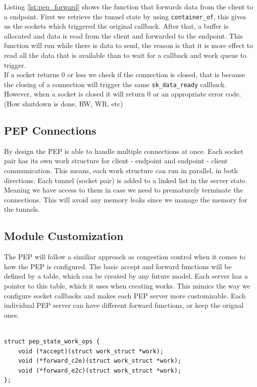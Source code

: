 \documentclass[a4paper,english, 11pt]{report}
\begin{document}
Listing \ref{lst:pep_forward} shows the function that forwards data from the client to a endpoint. First we retrieve the tunnel state by using \verb|container_of|, this gives us the sockets which triggered the original callback. After that, a buffer is allocated and data is read from the client and forwarded to the endpoint. This function will run while there is data to send, the reason is that it is more effect to read all the data that is available than to wait for a callback and work queue to trigger.\\

If a socket returns 0 or less we check if the connection is closed, that is because the closing of a connection will trigger the same \verb|sk_data_ready| callback. However, when a socket is closed it will return 0 or an appropriate error code. (How shutdown is done, RW, WR, etc)

\subsection{PEP Connections}
By design the PEP is able to handle multiple connections at once. Each socket pair has its own work structure for client - endpoint and endpoint - client communication. This means, each work structure can run in parallel, in both directions. Each tunnel (socket pair) is added to a linked list in the server state. Meaning we have access to them in case we need to prematurely terminate the connections. This will avoid any memory leaks since we manage the memory for the tunnels.\\

\subsection{Module Customization}
The PEP will follow a similiar approach as congestion control when it comes to how the PEP is configured. The basic accept and forward functions will be defined by a table, which can be created by any future model. Each server has a pointer to this table, which it uses when creating works. This mimics the way we configure socket callbacks and makes each PEP server more customizable. Each individual PEP server can have different forward functions, or keep the orignal ones.\\\\

\noindent\begin{minipage}{\linewidth}
\begin{verbatim}
struct pep_state_work_ops {
    void (*accept)(struct work_struct *work);
    void (*forward_c2e)(struct work_struct *work);
    void (*forward_e2c)(struct work_struct *work);
};
\end{verbatim}
\end{minipage}\\
\end{document}
